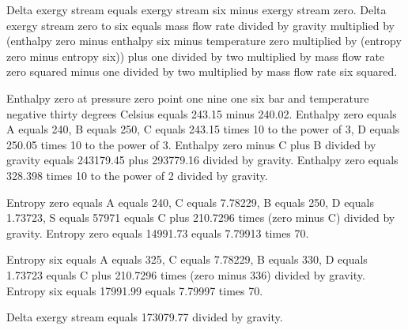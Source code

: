 Delta exergy stream equals exergy stream six minus exergy stream zero.  
Delta exergy stream zero to six equals mass flow rate divided by gravity multiplied by (enthalpy zero minus enthalpy six minus temperature zero multiplied by (entropy zero minus entropy six)) plus one divided by two multiplied by mass flow rate zero squared minus one divided by two multiplied by mass flow rate six squared.  

Enthalpy zero at pressure zero point one nine one six bar and temperature negative thirty degrees Celsius equals 243.15 minus 240.02.  
Enthalpy zero equals A equals 240, B equals 250, C equals 243.15 times 10 to the power of 3, D equals 250.05 times 10 to the power of 3.  
Enthalpy zero minus C plus B divided by gravity equals 243179.45 plus 293779.16 divided by gravity.  
Enthalpy zero equals 328.398 times 10 to the power of 2 divided by gravity.  

Entropy zero equals A equals 240, C equals 7.78229, B equals 250, D equals 1.73723, S equals 57971 equals C plus 210.7296 times (zero minus C) divided by gravity.  
Entropy zero equals 14991.73 equals 7.79913 times 70.  

Entropy six equals A equals 325, C equals 7.78229, B equals 330, D equals 1.73723 equals C plus 210.7296 times (zero minus 336) divided by gravity.  
Entropy six equals 17991.99 equals 7.79997 times 70.  

Delta exergy stream equals 173079.77 divided by gravity.
